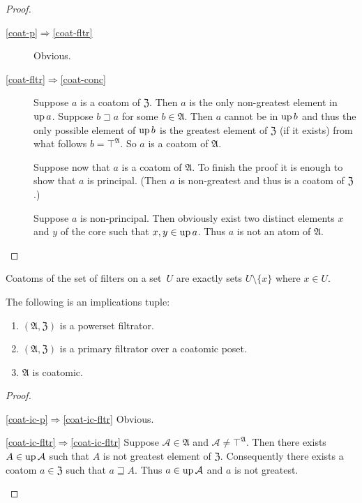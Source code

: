 \begin{proof}
~
\begin{description}
\item [{\ref{coat-p}$\Rightarrow$\ref{coat-fltr}}] Obvious.
\item [{\ref{coat-fltr}$\Rightarrow$\ref{coat-conc}}] Suppose $a$ is
a coatom of $\mathfrak{Z}$. Then $a$ is the only non-greatest element
in $\operatorname{up} a$. Suppose $b\sqsupset a$ for some $b\in\mathfrak{A}$.
Then $a$ cannot be in $\operatorname{up} b$ and thus the only possible element
of $\operatorname{up} b$ is the greatest element of $\mathfrak{Z}$ (if it exists)
from what follows $b=\top^{\mathfrak{A}}$. So $a$ is a coatom of
$\mathfrak{A}$.


Suppose now that $a$ is a coatom of $\mathfrak{A}$. To finish the
proof it is enough to show that $a$ is principal. (Then $a$ is non-greatest
and thus is a coatom of $\mathfrak{Z}$.)


Suppose $a$ is non-principal. Then obviously exist two distinct elements
$x$ and $y$ of the core such that $x,y\in\operatorname{up} a$. Thus $a$ is not
an atom of $\mathfrak{A}$.

\end{description}
\end{proof}
\begin{cor}
Coatoms of the set of filters on a set~$U$ are exactly sets $U\setminus\{x\}$
where $x\in U$.\end{cor}
\begin{prop}
\label{coat-ic}The following is an implications tuple:
\begin{enumerate}
\item \label{coat-ic-p}$(\mathfrak{A},\mathfrak{Z})$ is a powerset filtrator.
\item \label{coat-ic-fltr}$(\mathfrak{A},\mathfrak{Z})$ is a primary filtrator
over a coatomic poset.
\item \label{coat-ic-conc}$\mathfrak{A}$ is coatomic.
\end{enumerate}
\end{prop}
\begin{proof}
~
\begin{widedisorder}
\item [{\ref{coat-ic-p}$\Rightarrow$\ref{coat-ic-fltr}}] Obvious.
\item [{\ref{coat-ic-fltr}$\Rightarrow$\ref{coat-ic-fltr}}] Suppose
$\mathcal{A}\in\mathfrak{A}$ and $\mathcal{A}\neq\top^{\mathfrak{A}}$.
Then there exists $A\in\operatorname{up}\mathcal{A}$ such that $A$ is not greatest
element of $\mathfrak{Z}$. Consequently there exists a coatom $a\in\mathfrak{Z}$
such that $a\sqsupseteq A$. Thus $a\in\operatorname{up}\mathcal{A}$ and $a$ is
not greatest.
\end{widedisorder}
\end{proof}

